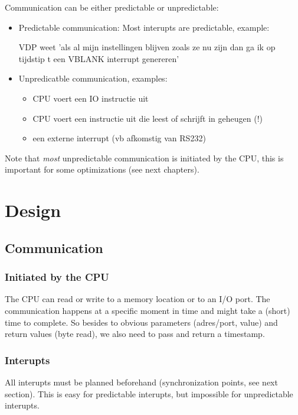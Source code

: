 \documentclass[11pt, a4paper]{report}
\begin{document}
Communication can be either predictable or unpredictable:
\begin{itemize}
\item Predictable communication: Most interupts are predictable, example:

VDP weet 'als al mijn instellingen blijven zoals ze nu zijn dan ga ik op 
tijdstip t een VBLANK interrupt genereren'

\item Unpredicatble communication, examples:
	\begin{itemize}
	\item CPU voert een IO instructie uit
	\item CPU voert een instructie uit die leest of schrijft in geheugen (!)
	\item een externe interrupt (vb afkomstig van RS232)
	\end{itemize}
\end{itemize}

Note that \emph{most} unpredictable communication is initiated by the CPU, this is
important for some optimizations (see next chapters).



\chapter{Design}

\section{Communication}

\subsection{Initiated by the CPU}

The CPU can read or write to a memory location or to an I/O port. The
communication happens at a specific moment in time and might take a (short) time
to complete. So besides to obvious parameters (adres/port, value) and return
values (byte read), we also need to pass and return a timestamp.


\subsection{Interupts}

All interupts must be planned beforehand (synchronization points, see next
section). This is easy for predictable interupts, but impossible for
unpredictable interupts. 
\end{document}

